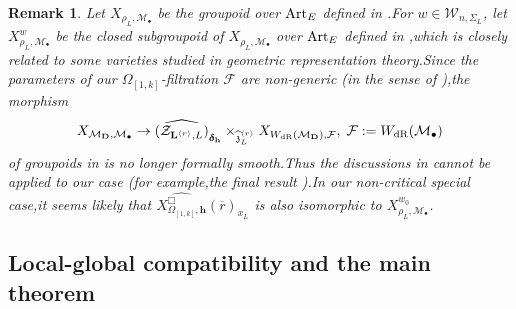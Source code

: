 \documentclass[SecEq,CM,GP]{degruyter-crelle} %
\theoremstyle{plain}
\newtheorem{rmk}[thm]{Remark}
\newcommand{\Art}{{\rm Art}}
\newcommand{\complocaldefvarrho}{{ \widehat{X^\Box_{\omepik,\mathbf{{h}}}}(\overline{r})_{x_L}}}
\newcommand{\dr}{{\rm dR}}
\newcommand{\Dpik}{{\mathbf{D}}}
\newcommand{\lrr}{{\langle r\rangle}}
\newcommand{\omepik}{\Omega_{[1,k]}}
\newcommand{\bL}{{\mathbf{L}}}
\newcommand{\bh}{{\mathbf{h}}}
\newcommand{\cM}{\mathcal M}
\newcommand{\cF}{\mathcal F}
\newcommand{\cZ}{\mathcal Z}
\newcommand{\fz}{{\mathfrak{z}}}
\newcommand{\sW}{\mathscr W}
\begin{document}
\begin{rmk}\label{localmodeldescri}Let $X_{\rho_L,\cM_{\bullet}}$ be the groupoid over $\Art_E$ defined in \cite[Section 6.4]{Ding2021}.\;For $w\in \sW_{n,\Sigma_L}$, let $X^{w}_{\rho_L,\cM_{\bullet}}$ be the closed subgroupoid of $X_{\rho_L,\cM_{\bullet}}$ over $\Art_E$ defined in \cite[Section 6.4]{Ding2021},\;which is closely related to some varieties studied in geometric representation theory.\;Since the parameters of our $\omepik$-filtration $\cF$ are non-generic (in the sense of \cite[(6.5)]{Ding2021}),\;the morphism \[X_{\cM_{\Dpik},\cM_{\bullet}}\rightarrow \widehat{(\cZ_{\bL^{\lrr},L})}_{\bm{\delta}_{\bh}}\times_{\widehat\fz^\lrr_{L}} X_{W_{\dr}(\cM_{\Dpik}),\cF},\;\cF:=W_{\dr}(\cM_{\bullet})\] of groupoids in \cite[Theorem.6]{Ding2021} is no longer formally smooth.\;Thus the discussions in  \cite[Section 6.4]{Ding2021}  cannot be applied to our case (for example,\;the final result \cite[Corollary 6.4.7]{Ding2021}).\;In our non-critical special case,\;it seems likely that $\complocaldefvarrho$ is also isomorphic to $X^{w_0}_{\rho_L,\cM_{\bullet}}$.\;
\end{rmk}








\subsection{Local-global compatibility and the main theorem}\label{lgcompthemainSECTION}
\end{document}
